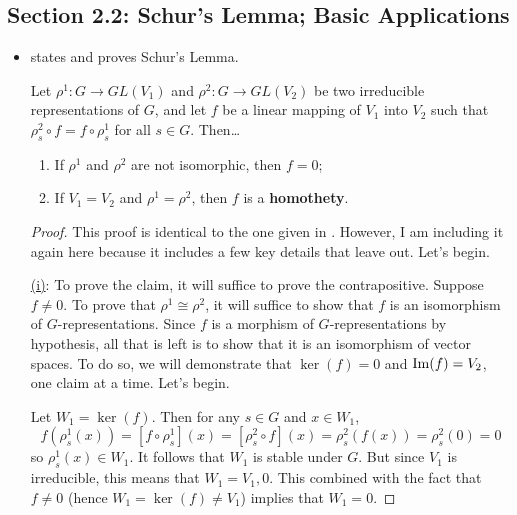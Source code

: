 \documentclass[../notes.tex]{subfiles}
\begin{document}
\subsection*{Section 2.2: Schur's Lemma; Basic Applications}
\begin{itemize}
    \item \textcite{bib:Serre} states and proves Schur's Lemma.
    \begin{proposition}
        Let $\rho^1:G\to GL(V_1)$ and $\rho^2:G\to GL(V_2)$ be two irreducible representations of $G$, and let $f$ be a linear mapping of $V_1$ into $V_2$ such that $\rho_s^2\circ f=f\circ\rho_s^1$ for all $s\in G$. Then\dots
        \begin{enumerate}[label={\textup{(\roman*)}}]
            \item If $\rho^1$ and $\rho^2$ are not isomorphic, then $f=0$;
            \item If $V_1=V_2$ and $\rho^1=\rho^2$, then $f$ is a \textbf{homothety}.
        \end{enumerate}
        \begin{proof}
            This proof is identical to the one given in \textcite{bib:FultonHarris}. However, I am including it again here because it includes a few key details that \textcite{bib:FultonHarris} leave out. Let's begin.\par\smallskip
            \underline{(i)}:
            To prove the claim, it will suffice to prove the contrapositive. Suppose $f\neq 0$. To prove that $\rho^1\cong\rho^2$, it will suffice to show that $f$ is an isomorphism of $G$-representations. Since $f$ is a morphism of $G$-representations by hypothesis, all that is left is to show that it is an isomorphism of vector spaces. To do so, we will demonstrate that $\ker(f)=0$ and $\operatorname{Im}(f)=V_2$, one claim at a time. Let's begin.\par
            Let $W_1=\ker(f)$. Then for any $s\in G$ and $x\in W_1$,
            \begin{equation*}
                f(\rho_s^1(x)) = [f\circ\rho_s^1](x)
                = [\rho_s^2\circ f](x)
                = \rho_s^2(f(x))
                = \rho_s^2(0)
                = 0
            \end{equation*}
            so $\rho_s^1(x)\in W_1$. It follows that $W_1$ is stable under $G$. But since $V_1$ is irreducible, this means that $W_1=V_1,0$. This combined with the fact that $f\neq 0$ (hence $W_1=\ker(f)\neq V_1$) implies that $W_1=0$.\par

\end{proof}
\end{proposition}
\end{itemize}
\end{document}
